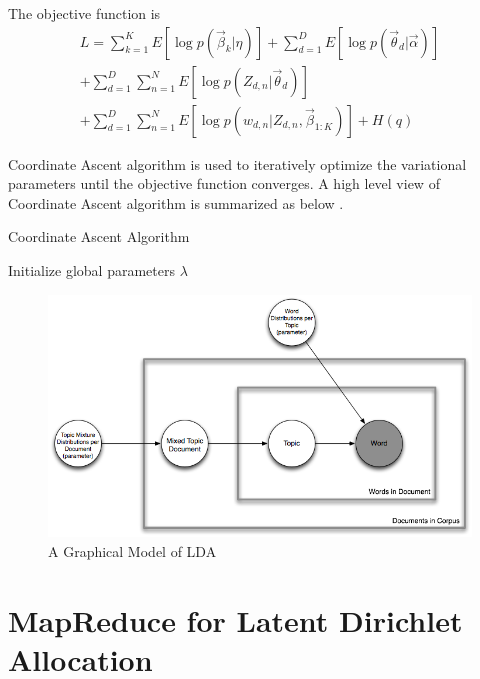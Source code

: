 \documentclass[conference]{IEEEtran}
\begin{document}
The objective function is
\begin{equation}
\begin{split}
L = \sum_{k=1}^{K}E[\log p(\overrightarrow{\beta}_{k}|\eta)]+
\sum_{d=1}^{D}{E[\log p(\overrightarrow{\theta}_d|\overrightarrow{\alpha})]} \\
+ \sum_{d=1}^{D}\sum_{n=1}^{N}{E[\log p(Z_{d,n}|\overrightarrow{\theta}_d)]} \\
+ \sum_{d=1}^{D}\sum_{n=1}^{N}{E[\log p(w_{d,n}|Z_{d,n},\overrightarrow{\beta}_{1:K})]}+H(q)
\end{split}
\end{equation}

Coordinate Ascent algorithm is used to iteratively optimize the variational parameters until the objective function converges. A high level view of Coordinate Ascent algorithm is summarized as below \cite{caa}. 
\begin{algorithm}
\caption{Coordinate Ascent Algorithm}
\label{alg:lda}
\begin{algorithmic}
    \REQUIRE Initialize global parameters $\lambda$
\REPEAT
    \ENDFOR
\end{algorithmic}
\end{algorithm}


\begin{figure}[!t]
\centering
\includegraphics[width=5in]{lda.png}
\caption{A Graphical Model of LDA}
\label{gm_lda}
\end{figure}

\section{MapReduce for Latent Dirichlet Allocation}
\end{document}
